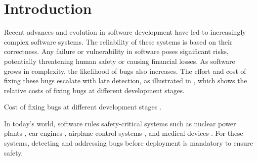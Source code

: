 \setchapterpreamble[u]{\margintoc}


\chapter{Introduction}


Recent advances and evolution in software development have led to increasingly complex software systems.
The reliability of these systems is based on their correctness.
Any failure or vulnerability in software poses significant risks, potentially threatening human safety or causing financial losses.
As software grows in complexity, the likelihood of bugs also increases.
The effort and cost of fixing these bugs escalate with late detection, as illustrated in  , which shows the relative costs of fixing bugs at different development stages.

\begin{margintable}
  \caption{Cost of fixing bugs at different development stages \cite{White2017}.}
  \centering
\end{margintable}


In today's world, software rules safety-critical systems such as nuclear power plants ,
car engines ,
airplane control systems
,
and medical devices .
For these systems, detecting and addressing bugs before deployment is mandatory to ensure safety.

